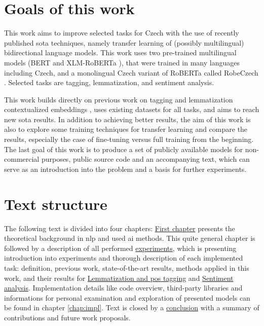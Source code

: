 \section*{Goals of this work}
This work aims to improve selected  tasks for Czech with the use of recently published \acrfull{sota} techniques, namely transfer learning of (possibly multilingual) bidirectional language models. This work uses two pre-trained multilingual models (BERT \citep{Devlin2019} and XLM-RoBERTa \citep{Conneau2019}), that were trained in many languages including Czech, and a monolingual Czech variant of RoBERTa called RobeCzech \citep{Straka2021}. Selected tasks are tagging, lemmatization, and sentiment analysis.\par This work builds directly on previous work on tagging and lemmatization contextualized embeddings \citep{straka2019czech}, uses existing datasets for all tasks, and aims to reach new \acrfull{sota} results. In addition to achieving better results, the aim of this work is also to explore some training techniques for transfer learning and compare the results, especially the case of fine-tuning versus full training from the beginning.  The last goal of this work is to produce a set of publicly available models for non-commercial purposes, public source code and an accompanying text, which can serve as an introduction into the problem and a basis for further experiments.
\section*{Text structure}
The following text is divided into four chapters: \hyperref[chap:theandme]{First chapter} presents the theoretical background in \acrshort{nlp} and used \acrfull{ai} methods. This quite general chapter is followed by a description of all performed \hyperref[chap:exp]{experiments}, which is presenting introduction into experiments and thorough description of each implemented task: definition, previous work, state-of-the-art results, methods applied in this work, and their results for \hyperref[chap:tag]{Lemmatization and \acrlong{pos} tagging} and  \hyperref[chap:sent]{Sentiment analysis}. Implementation details like code overview, third-party libraries and informations for personal examination and exploration of presented models can be found in chapter \ref{chap:impl}. Text is closed by a \hyperref[chap:concl]{conclusion} with a summary of contributions and future work proposals.

